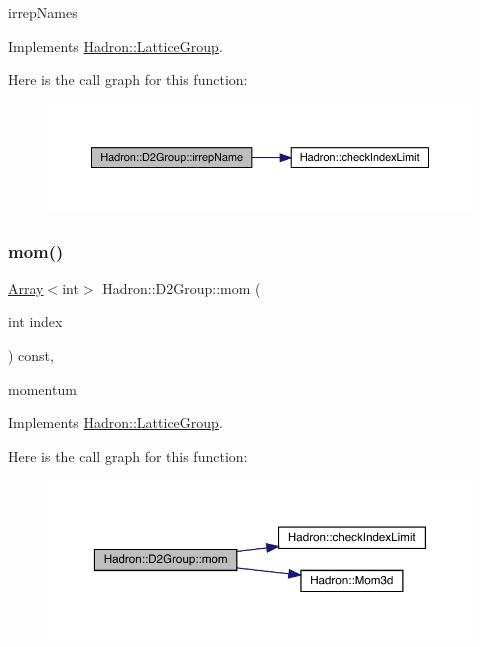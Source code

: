 irrep\+Names 

Implements \mbox{\hyperlink{structHadron_1_1LatticeGroup_a4bc5620218c2a73157e19bc4451fe746}{Hadron\+::\+Lattice\+Group}}.

Here is the call graph for this function\+:
\nopagebreak
\begin{figure}[H]
\begin{center}
\leavevmode
\includegraphics[width=350pt]{d8/de7/structHadron_1_1D2Group_a502111e32a238c50b248b9f7b0625385_cgraph}
\end{center}
\end{figure}
\mbox{\label{structHadron_1_1D2Group_a65d28ef1fef635e870d60b6606b65f19}} 
\subsubsection{\texorpdfstring{mom()}{mom()}\hspace{0.1cm}{\footnotesize\ttfamily [1/2]}}
{\footnotesize\ttfamily \mbox{\hyperlink{classXMLArray_1_1Array}{Array}}$<$int$>$ Hadron\+::\+D2\+Group\+::mom (\begin{DoxyParamCaption}\item[{int}]{index }\end{DoxyParamCaption}) const\hspace{0.3cm}{\ttfamily [inline]}, {\ttfamily [virtual]}}

momentum 

Implements \mbox{\hyperlink{structHadron_1_1LatticeGroup_ad577b65041dd9a6e84b1f3bd49cb8fce}{Hadron\+::\+Lattice\+Group}}.

Here is the call graph for this function\+:
\nopagebreak
\begin{figure}[H]
\begin{center}
\leavevmode
\includegraphics[width=350pt]{d8/de7/structHadron_1_1D2Group_a65d28ef1fef635e870d60b6606b65f19_cgraph}
\end{center}
\end{figure}
\mbox{\label{structHadron_1_1D2Group_a65d28ef1fef635e870d60b6606b65f19}} 

